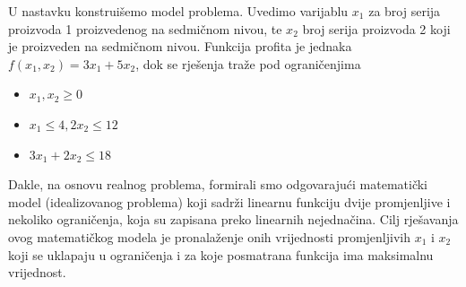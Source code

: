 \documentclass[a4paper, utf8, 11pt, colorlinks]{book}
\theoremstyle{definition}
\begin{document}
\begin{table}[!ht]
    \centering
    \caption{Procjene konstanti modela.}
    \label{tab:procjene-1}
\end{table}

U nastavku konstruišemo model problema. Uvedimo varijablu $x_1$ za broj serija proizvoda 1 proizvedenog na sedmičnom nivou, te $x_2$ broj serija proizvoda 2 koji je proizveden na sedmičnom nivou. Funkcija profita je jednaka $f(x_1, x_2) = 3 x_1 + 5 x_2$, dok se rješenja traže pod ograničenjima
\begin{itemize}
    \item $x_1, x_2 \geq 0$
    \item  $x_1 \leq 4, 2 x_2 \leq 12$
    \item $3 x_1 + 2 x_2 \leq 18$
\end{itemize}

Dakle, na osnovu realnog problema, formirali smo odgovarajući matematički model (idealizovanog problema) koji sadrži  linearnu funkciju dvije promjenljive i nekoliko ograničenja, koja su zapisana preko linearnih nejednačina. Cilj rješavanja ovog matematičkog modela je pronalaženje onih vrijednosti promjenljivih $x_1$ i $x_2$ koji se uklapaju u ograničenja i za koje posmatrana funkcija ima maksimalnu vrijednost.

\end{document}
